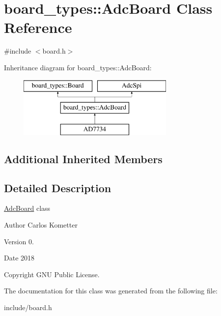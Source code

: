 \hypertarget{classboard__types_1_1AdcBoard}{}\section{board\+\_\+types\+:\+:Adc\+Board Class Reference}
\label{classboard__types_1_1AdcBoard}


{\ttfamily \#include $<$board.\+h$>$}

Inheritance diagram for board\+\_\+types\+:\+:Adc\+Board\+:\begin{figure}[H]
\begin{center}
\leavevmode
\includegraphics[height=3.000000cm]{classboard__types_1_1AdcBoard}
\end{center}
\end{figure}
\subsection*{Additional Inherited Members}


\subsection{Detailed Description}
\mbox{\hyperlink{classboard__types_1_1AdcBoard}{Adc\+Board}} class \begin{DoxyAuthor}{Author}
Carlos Kometter 
\end{DoxyAuthor}
\begin{DoxyVersion}{Version}
0. 
\end{DoxyVersion}
\begin{DoxyDate}{Date}
2018 
\end{DoxyDate}
\begin{DoxyCopyright}{Copyright}
G\+NU Public License. 
\end{DoxyCopyright}


The documentation for this class was generated from the following file\+:\begin{DoxyCompactItemize}
\item 
include/board.\+h\end{DoxyCompactItemize}
